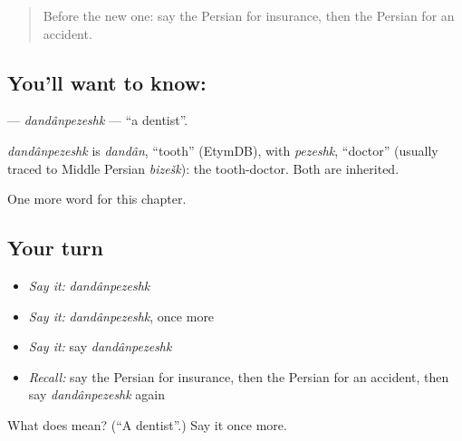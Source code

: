 \label{lesson:FA-C227-dandanpezeshk}



\begin{quote}
Before the new one: say the Persian for insurance, then the Persian for an accident.
\end{quote}

\subsection*{You'll want to know: }
\textbf{} — \emph{dandânpezeshk} — \textquotedblleft{}a dentist\textquotedblright{}.

\begin{cousinweb}
\emph{dandânpezeshk} is \emph{dandân}, \textquotedblleft{}tooth\textquotedblright{} (EtymDB), with \emph{pezeshk}, \textquotedblleft{}doctor\textquotedblright{} (usually traced to Middle Persian \emph{bizešk}): the tooth-doctor. Both are inherited.
\end{cousinweb}

\begin{grammarlens}[title={What you've built}]
One more word for this chapter.
\end{grammarlens}

\subsection*{Your turn}
\begin{itemize}
\raggedright
  \item \emph{Say it:} \emph{dandânpezeshk}
  \item \emph{Say it:} \emph{dandânpezeshk}, once more
  \item \emph{Say it:} say \emph{dandânpezeshk}
  \item \emph{Recall:} say the Persian for insurance, then the Persian for an accident, then say \emph{dandânpezeshk} again
\end{itemize}

\begin{tcolorbox}[breakable,colback=teal!4,colframe=teal!35!black,title={Before you move on}]
What does  mean? (\textquotedblleft{}A dentist\textquotedblright{}.) Say it once more.
\end{tcolorbox}
